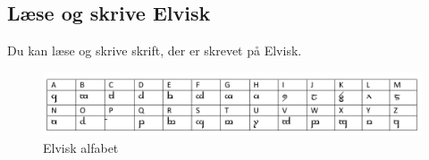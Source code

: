 \subsection*{Læse og skrive Elvisk}
Du kan læse og skrive skrift, der er skrevet på Elvisk.\\
\begin{figure}[H]
    \centering
    \includegraphics[width=1\textwidth]{setup/Alfabeter/Elvisk alfabet.pdf}
    \caption{Elvisk alfabet}
\end{figure}